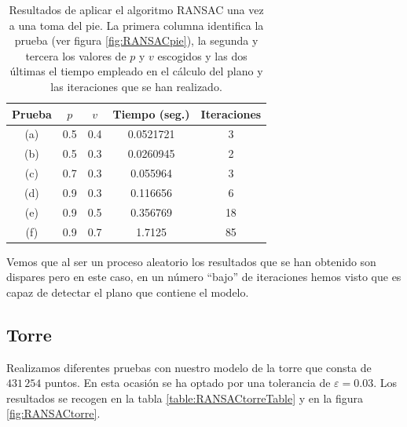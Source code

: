 \begin{table}[h!]
	\centering
	\begin{tabular}{| c | c | c || c | c |} 
		\hline
		Prueba & $ p $ & $ v $ & Tiempo (seg.) & Iteraciones \\
		\hline
		(a) & 0.5 & 0.4 & 0.0521721 & 3 \\		
		(b) & 0.5 & 0.3 & 0.0260945 & 2  \\	
		(c) & 0.7 & 0.3 & 0.055964 &  3 \\
		(d) & 0.9 & 0.3 & 0.116656 & 6\\
		(e) & 0.9 & 0.5 & 0.356769 & 18\\
		(f) & 0.9 & 0.7 & 1.7125 & 85\\
		\hline
	\end{tabular}
	\caption{Resultados de aplicar el algoritmo RANSAC una vez a una toma del pie. La primera columna identifica la prueba (ver figura \ref{fig:RANSACpie}), la segunda y tercera los valores de $ p $ y $ v $ escogidos y las dos últimas el tiempo empleado en el cálculo del plano y las iteraciones que se han realizado.}
	\label{table:RANSACpieTable}
\end{table}

Vemos que al ser un proceso aleatorio los resultados que se han obtenido son dispares pero en este caso, en un número ``bajo'' de iteraciones hemos visto que es capaz de detectar el plano que contiene el modelo.

\subsection{Torre}
Realizamos diferentes pruebas con nuestro modelo de la torre que consta de $ 431\,254 $ puntos. En esta ocasión se ha optado por una tolerancia de $ \varepsilon = 0.03 $. Los resultados se recogen en la tabla \ref{table:RANSACtorreTable} y en la figura \ref{fig:RANSACtorre}. \\


